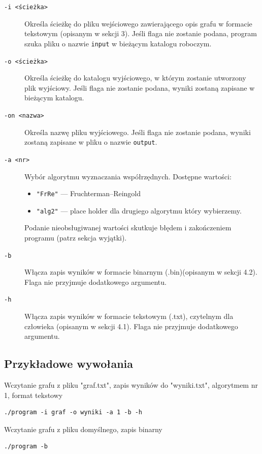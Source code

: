 \documentclass[12pt]{article}
\begin{document}
\begin{description}
	\item[\texttt{-i <ścieżka>}]
	      Określa ścieżkę do pliku wejściowego zawierającego opis grafu w formacie
	      tekstowym (opisanym w sekcji 3). Jeśli flaga nie zostanie podana, program
	      szuka pliku o nazwie \texttt{input} w bieżącym katalogu roboczym.

	\item[\texttt{-o <ścieżka>}]
	      Określa ścieżkę do katalogu wyjściowego, w którym zostanie utworzony plik wyjściowy.
	      Jeśli flaga nie zostanie podana, wyniki zostaną zapisane w bieżącym katalogu.
	\item[\texttt{-on <nazwa>}]
	      Określa nazwę pliku wyjściowego. Jeśli flaga nie zostanie podana, wyniki zostaną zapisane w pliku o nazwie \texttt{output}.

	\item[\texttt{-a <nr>}]
	      Wybór algorytmu wyznaczania współrzędnych. Dostępne wartości:
	      \begin{itemize}
		      \item \texttt{"FrRe"} — Fruchterman–Reingold
		      \item \texttt{"alg2"} — place holder dla drugiego algorytmu który wybierzemy.
	      \end{itemize}
	      Podanie nieobsługiwanej wartości skutkuje błędem i zakończeniem programu
	      (patrz sekcja wyjątki).

	\item[\texttt{-b}]
	      Włącza zapis wyników w formacie binarnym (.bin)(opisanym w sekcji 4.2).
	      Flaga nie przyjmuje dodatkowego argumentu.

	\item[\texttt{-h}]
	      Włącza zapis wyników w formacie tekstowym (.txt), czytelnym dla człowieka
	      (opisanym w sekcji 4.1). Flaga nie przyjmuje dodatkowego argumentu.
\end{description}

\subsection{Przykładowe wywołania}
Wczytanie grafu z pliku "graf.txt", zapis wyników do "wyniki.txt", algorytmem nr 1, format tekstowy
\begin{verbatim}
./program -i graf -o wyniki -a 1 -b -h
\end{verbatim}
Wczytanie grafu z pliku domyślnego, zapis binarny
\begin{verbatim}
./program -b
\end{verbatim}
\end{document}
